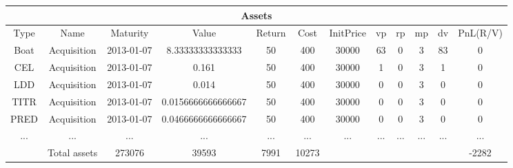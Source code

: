 \begin{longtable}{|c|c|c|c|c|c|c|c|c|c|c|c|}
\hline
\multicolumn{12}{|c|}{Assets} \\
\hline
Type & Name & Maturity & Value & Return & Cost & InitPrice & vp & rp & mp & dv & PnL(R/V)\\
\hline
Boat & Acquisition & 2013-01-07 & 8.33333333333333 & 50 & 400 & 30000 & 63 & 0 & 3 & 83 & 0\\
\hline
CEL & Acquisition & 2013-01-07 & 0.161 & 50 & 400 & 30000 & 1 & 0 & 3 & 1 & 0\\
\hline
LDD & Acquisition & 2013-01-07 & 0.014 & 50 & 400 & 30000 & 0 & 0 & 3 & 0 & 0\\
\hline
TITR & Acquisition & 2013-01-07 & 0.0156666666666667 & 50 & 400 & 30000 & 0 & 0 & 3 & 0 & 0\\
\hline
PRED & Acquisition & 2013-01-07 & 0.0466666666666667 & 50 & 400 & 30000 & 0 & 0 & 3 & 0 & 0\\
\hline
 ... & ... & ... & ... & ... & ... & ... & ... & ... & ... & ... & ...\\
\hline
& Total assets & 273076 & 39593 & 7991 & 10273 & & & & & & -2282\\
\hline
\end{longtable}
